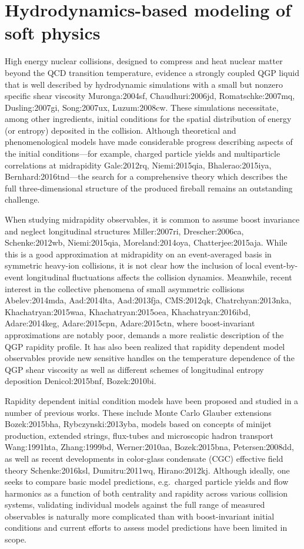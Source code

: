 \chapter{Hydrodynamics-based modeling of soft physics }
High energy nuclear collisions, designed to compress and heat nuclear matter beyond the QCD transition temperature, evidence a strongly coupled QGP liquid that is well described by hydrodynamic simulations with a small but nonzero specific shear viscosity {Muronga:2004sf, Chaudhuri:2006jd, Romatschke:2007mq, Dusling:2007gi, Song:2007ux, Luzum:2008cw}.
These simulations necessitate, among other ingredients, initial conditions for the spatial distribution of energy (or entropy) deposited in the collision.
Although theoretical and phenomenological models have made considerable progress describing aspects of the initial conditions---for example, charged particle yields and multiparticle correlations at midrapidity {Gale:2012rq, Niemi:2015qia, Bhalerao:2015iya, Bernhard:2016tnd}---the search for a comprehensive theory which describes the full three-dimensional structure of the produced fireball remains an outstanding challenge.

When studying midrapidity observables, it is common to assume boost invariance and neglect longitudinal structures {Miller:2007ri, Drescher:2006ca, Schenke:2012wb, Niemi:2015qia, Moreland:2014oya, Chatterjee:2015aja}.
While this is a good approximation at midrapidity on an event-averaged basis in symmetric heavy-ion collisions, it is not clear how the inclusion of local event-by-event longitudinal fluctuations affects the collision dynamics.
Meanwhile, recent interest in the collective phenomena of small asymmetric collisions {Abelev:2014mda, Aad:2014lta, Aad:2013fja, CMS:2012qk, Chatrchyan:2013nka, Khachatryan:2015waa, Khachatryan:2015oea, Khachatryan:2016ibd, Adare:2014keg, Adare:2015cpn, Adare:2015ctn}, where boost-invariant approximations are notably poor, demands a more realistic description of the QGP rapidity profile.
It has also been realized that rapidity dependent model observables provide new sensitive handles on the temperature dependence of the QGP shear viscosity as well as different schemes of longitudinal entropy deposition {Denicol:2015bnf, Bozek:2010bi}.

Rapidity dependent initial condition models have been proposed and studied in a number of previous works. 
These include Monte Carlo Glauber extensions {Bozek:2015bha, Rybczynski:2013yba}, models based on concepts of minijet production, extended strings, flux-tubes and microscopic hadron transport {Wang:1991hta, Zhang:1999bd, Werner:2010aa, Bozek:2015bna, Petersen:2008dd}, as well as recent developments in color-glass condensate (CGC) effective field theory {Schenke:2016ksl, Dumitru:2011wq, Hirano:2012kj}.
Although ideally, one seeks to compare basic model predictions, e.g.\ charged particle yields and flow harmonics as a function of both centrality and rapidity across various collision systems, validating individual models against the full range of measured observables is naturally more complicated than with boost-invariant initial conditions and current efforts to assess model predictions have been limited in scope.

